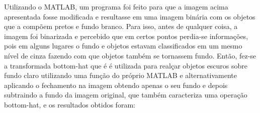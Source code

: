 \documentclass[journal]{IEEEtran}
\begin{document}
\begin{figure}[h]
\centering
{}
\end{figure}
	
Utilizando o MATLAB, um programa foi feito para que a imagem acima apresentada fosse modificada e resultasse em uma imagem binária com os objetos que a compõem pretos e fundo branco. Para isso, antes de qualquer coisa, a imagem foi binarizada e percebido que em certos pontos perdia-se informações, pois em alguns lugares o fundo e objetos estavam classificados em um mesmo nível de cinza fazendo com que objetos também se tornassem fundo. Então, fez-se a transformada bottom-hat que é é utilizada para realçar objetos escuros sobre fundo claro utilizando uma função do próprio MATLAB e alternativamente aplicando o fechamento na imagem obtendo apenas o seu fundo e depois subtraindo a fundo da imagem original, que também caracteriza uma operação bottom-hat, e os resultados obtidos foram:
\end{document}

